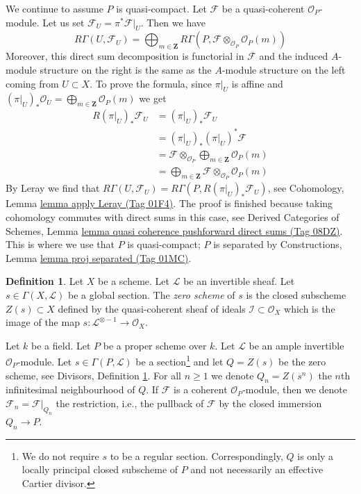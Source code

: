 \documentclass{amsart}
\theoremstyle{plain}
\theoremstyle{definition}
\newtheorem{definition}[subsection]{Definition}
\theoremstyle{remark}
\numberwithin{equation}{subsection}
\begin{document}
\medskip\noindent
We continue to assume $P$ is quasi-compact.
Let $\mathcal{F}$ be a quasi-coherent $\mathcal{O}_P$-module.
Let us set $\mathcal{F}_U = \pi^*\mathcal{F}|_U$. Then we have
\begin{equation}
\label{more-morphisms-equation-cohomology-torsor}
R\Gamma(U, \mathcal{F}_U) =
\bigoplus\nolimits_{m \in \mathbf{Z}}
R\Gamma(P, \mathcal{F} \otimes_{\mathcal{O}_P} \mathcal{O}_P(m))
\end{equation}
Moreover, this direct sum decomposition is functorial in $\mathcal{F}$
and the induced $A$-module structure on the right is the same as the
$A$-module structure on the left coming from $U \subset X$.
To prove the formula, since $\pi|_U$ is affine and
$(\pi|_U)_*\mathcal{O}_U = \bigoplus_{m \in \mathbf{Z}} \mathcal{O}_P(m)$
we get
\begin{align*}
R(\pi|_U)_*\mathcal{F}_U
& =
(\pi|_U)_*\mathcal{F}_U \\
& =
(\pi|_U)_*(\pi|_U)^*\mathcal{F} \\
& =
\mathcal{F} \otimes_{\mathcal{O}_P} 
\bigoplus\nolimits_{m \in \mathbf{Z}} \mathcal{O}_P(m) \\
& =
\bigoplus\nolimits_{m \in \mathbf{Z}}
\mathcal{F} \otimes_{\mathcal{O}_P} \mathcal{O}_P(m)
\end{align*}
By Leray we find that
$R\Gamma(U, \mathcal{F}_U) =
R\Gamma(P, R(\pi|_U)_*\mathcal{F}_U)$, see
Cohomology, Lemma \href{https://stacks.math.columbia.edu/tag/01F4}{lemma apply Leray (Tag 01F4)}.
The proof is finished because taking cohomology commutes with
direct sums in this case, see Derived Categories of Schemes, Lemma
\href{https://stacks.math.columbia.edu/tag/08DZ}{lemma quasi coherence pushforward direct sums (Tag 08DZ)}.
This is where we use that $P$ is quasi-compact; $P$ is separated
by Constructions, Lemma \href{https://stacks.math.columbia.edu/tag/01MC}{lemma proj separated (Tag 01MC)}.

\begin{definition}
\label{divisors-definition-zero-scheme-s}
Let $X$ be a scheme. Let $\mathcal{L}$ be an invertible sheaf.
Let $s \in \Gamma(X, \mathcal{L})$ be a global section.
The {\it zero scheme} of $s$ is the closed subscheme $Z(s) \subset X$
defined by the quasi-coherent sheaf of ideals
$\mathcal{I} \subset \mathcal{O}_X$ which is the image of the
map $s : \mathcal{L}^{\otimes -1} \to \mathcal{O}_X$.
\end{definition}

\medskip\noindent
Let $k$ be a field. Let $P$ be a proper scheme over $k$.
Let $\mathcal{L}$ be an ample invertible $\mathcal{O}_P$-module.
Let $s \in \Gamma(P, \mathcal{L})$ be a section\footnote{We do not
require $s$ to be a regular section. Correspondingly, $Q$ is only
a locally principal closed subscheme of $P$ and not necessarily an effective
Cartier divisor.} and let
$Q = Z(s)$ be the zero scheme, see
Divisors, Definition \ref{divisors-definition-zero-scheme-s}.
For all $n \geq 1$ we denote $Q_n = Z(s^n)$
the $n$th infinitesimal neighbourhood of $Q$.
If $\mathcal{F}$ is a coherent $\mathcal{O}_P$-module, then we denote
$\mathcal{F}_n = \mathcal{F}|_{Q_n}$ the restriction, i.e.,
the pullback of $\mathcal{F}$ by the closed immersion
$Q_n \to P$.
\end{document}

